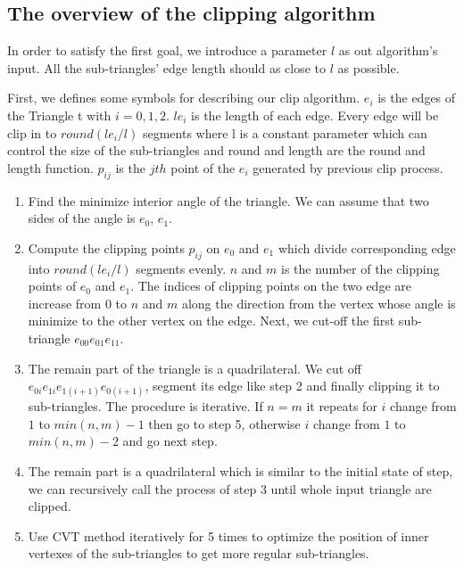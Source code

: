\documentclass[3p]{elsarticle}
\begin{document}
\subsection{The overview of the clipping algorithm}
In order to satisfy the first goal, we introduce a parameter $l$ as out algorithm's input. All the sub-triangles' edge length should as close to $l$ as possible.

First, we defines some symbols for describing our clip algorithm. $e_i$ is the edges of the Triangle t with $i = 0, 1, 2$. $le_i$ is the length of each edge. Every edge will be clip in to $round(le_i / l)$ segments where l is a constant parameter which can control the size of the sub-triangles and round and length are the round and length function. $p_{ij}$ is the $jth$ point of the $e_i$ generated by previous clip process.
\begin{enumerate}
    \item Find the minimize interior angle of the triangle. We can assume that two sides of the angle is $e_0$, $e_1$.
    \item Compute the clipping points $p_{ij}$ on $e_0$ and $e_1$ which divide corresponding edge into $round(le_i / l)$ segments evenly. $n$ and $m$ is the number of the clipping points of $e_0$ and $e_1$. The indices of clipping points on the two edge are increase from $0$ to $n$ and $m$ along the direction from the vertex whose angle is minimize to the other vertex on the edge. Next, we cut-off the first sub-triangle $e_{00}e_{01}e_{11}$.
    \item The remain part of the triangle is a quadrilateral. We cut off $e_{0i}e_{1i}e_{1(i+1)}e_{0(i+1)}$, segment its edge like step 2 and finally clipping it to sub-triangles. The procedure is iterative. If $n = m$ it repeats for $i$ change from $1$ to $ min(n, m) - 1$ then go to step 5, otherwise $i$ change from $1$ to $min(n, m) - 2$ and go next step.
    \item The remain part is a quadrilateral which is similar to the initial state of step, we can recursively call the process of step 3 until whole input triangle are clipped.
    \item Use CVT method iteratively for 5 times to optimize the position of inner vertexes of the sub-triangles to get more regular sub-triangles.
\end{enumerate}
\end{document}
